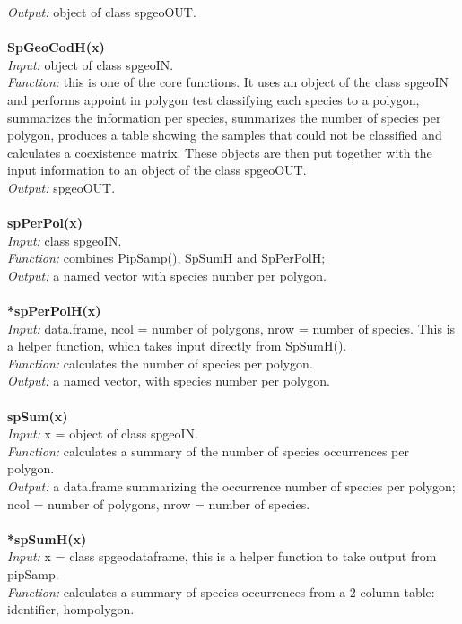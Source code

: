 \documentclass[a4paper,titlepage,11pt]{scrreprt}
\begin{document}
\textit{Output:} object of class spgeoOUT.\\
\\
\textbf{SpGeoCodH(x)}\\
\textit{Input:} object of class spgeoIN.\\
\textit{Function:} this is one of the core functions. It uses an object of the class spgeoIN and performs appoint in polygon test classifying each species to a polygon, summarizes the information per species, summarizes the number of species per polygon, produces a table  showing the samples that could not be classified and calculates a coexistence matrix. These objects are then put together with the input information to an object of the class spgeoOUT.\\
\textit{Output:} spgeoOUT.\\
\\
\textbf{spPerPol(x)}\\
\textit{Input:} class spgeoIN.\\
\textit{Function:} combines PipSamp(), SpSumH and SpPerPolH;\\
\textit{Output:} a named vector with species number per polygon.\\
\\
\textbf{*spPerPolH(x)}\\
\textit{Input:} data.frame, ncol = number of polygons, nrow = number of species. This is a helper function, which takes input directly from SpSumH().\\
\textit{Function:} calculates the number of species per polygon.\\
\textit{Output:} a named vector, with species number per polygon.\\
\\
\textbf{spSum(x)}\\
\textit{Input:} x = object of class spgeoIN.\\
\textit{Function:} calculates a summary of the number of species occurrences per polygon.\\
\textit{Output:} a data.frame summarizing the occurrence number of species per polygon; ncol = number of polygons, nrow = number of species.\\
\\
\textbf{*spSumH(x)}\\
\textit{Input:} x = class spgeodataframe, this is a helper function to take output from pipSamp.\\
\textit{Function:} calculates a summary of species occurrences from a 2 column table: identifier, hompolygon.\\
\end{document}
